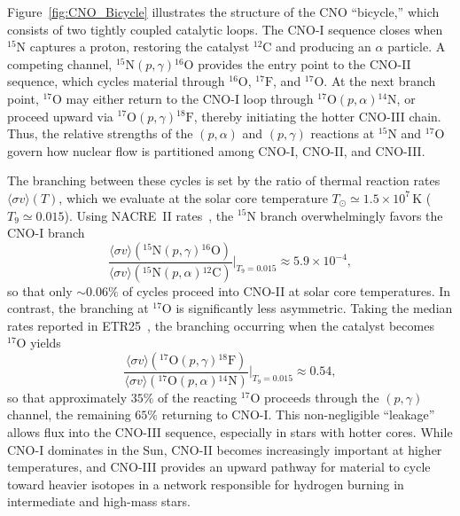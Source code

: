 \documentclass[particles,article,accept,pdftex,moreauthors]{Definitions/mdpi}
\begin{document}
Figure~\ref{fig:CNO_Bicycle} illustrates the structure of the CNO ``bicycle,'' which consists of two tightly coupled catalytic loops. The CNO-I sequence closes when ${}^{15}\mathrm{N}$ captures a proton, restoring the catalyst ${}^{12}\mathrm{C}$ and producing an $\alpha$ particle. A competing channel, ${}^{15}\mathrm{N}(p,\gamma){}^{16}\mathrm{O}$ provides the entry point to the CNO-II sequence, which cycles material through ${}^{16}\mathrm{O}$, ${}^{17}\mathrm{F}$, and ${}^{17}\mathrm{O}$. At the next branch point, ${}^{17}\mathrm{O}$ may either return to the CNO-I loop through ${}^{17}\mathrm{O}(p,\alpha){}^{14}\mathrm{N}$, or proceed upward via ${}^{17}\mathrm{O}(p,\gamma){}^{18}\mathrm{F}$, thereby initiating the hotter CNO-III chain. Thus, the relative strengths of the $(p,\alpha)$ and $(p,\gamma)$ reactions at ${}^{15}$N and ${}^{17}$O govern how nuclear flow is partitioned among CNO-I, CNO-II, and CNO-III.

The branching between these cycles is set by the ratio of thermal reaction rates $\langle\sigma v\rangle(T)$, which we evaluate at the solar core temperature $T_{\odot}\simeq1.5\times10^{7}\,\mathrm{K}$ ($T_{9}\simeq 0.015$). Using NACRE~II rates~\cite{Xu:2013fha}, the ${}^{15}$N branch overwhelmingly favors the CNO-I branch
\begin{equation}
\frac{\langle\sigma v\rangle({}^{15}\mathrm{N}(p,\gamma){}^{16}\mathrm{O})}
 {\langle\sigma v\rangle({}^{15}\mathrm{N}(p,\alpha){}^{12}\mathrm{C})}
 \Bigg|_{T_{9}=0.015}
 \approx 5.9\times10^{-4},
\end{equation}
so that only ${\sim}0.06\%$ of cycles proceed into CNO-II at solar core temperatures. In contrast, the branching at ${}^{17}$O is significantly less asymmetric. Taking the median rates reported in ETR25~\cite{Iliadis:2026hww,iliadis_2025_17610211}, the branching occurring when the catalyst becomes ${}^{17}\mathrm{O}$ yields
\begin{equation}
\frac{\langle\sigma v\rangle({}^{17}\mathrm{O}(p,\gamma){}^{18}\mathrm{F})}
 {\langle\sigma v\rangle({}^{17}\mathrm{O}(p,\alpha){}^{14}\mathrm{N})}
 \Bigg|_{T_{9}=0.015}
 \approx 0.54,
\end{equation}
so that approximately $35\%$ of the reacting ${}^{17}$O proceeds through the $(p,\gamma)$ channel, the remaining $65\%$ returning to CNO-I. This non-negligible ``leakage'' allows flux into the CNO-III sequence, especially in stars with hotter cores. While CNO-I dominates in the Sun, CNO-II becomes increasingly important at higher temperatures, and CNO-III provides an upward pathway for material to cycle toward heavier isotopes in a network responsible for hydrogen burning in intermediate and high-mass stars.
\end{document}
